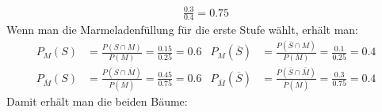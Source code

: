 \begin{exercise}
\begin{enumerate}[a)]
\begin{align*}
              \frac{\num{0.3}}{\num{0.4}}=
              \num{0.75}
            \end{align*}
            Wenn man die Marmeladenfüllung für die erste
            Stufe wählt, erhält man:
            \begin{align*}
              P_{M}(S)&=
              \frac{P(S\cap M)}{P(M)}=
              \frac{\num{0.15}}{\num{0.25}}=
              \num{0.6}
              &
              P_{M}(\overline{S})&=
              \frac{P(\overline{S}\cap M)}{P(M)}=
              \frac{\num{0.1}}{\num{0.25}}=
              \num{0.4}
              \\
              P_{\overline{M}}(S)&=
              \frac{P(S\cap\overline{M})}{P(\overline{M})}=
              \frac{\num{0.45}}{\num{0.75}}=
              \num{0.6}
              &
              P_{\overline{M}}(\overline{S})&=
              \frac{P(\overline{S}\cap\overline{M})}{P(\overline{M})}=
              \frac{\num{0.3}}{\num{0.75}}=
              \num{0.4}
            \end{align*}
            Damit erhält man die beiden Bäume:\bigskip\par
            \hspace*{\fill}%
\end{enumerate}
\end{exercise}

